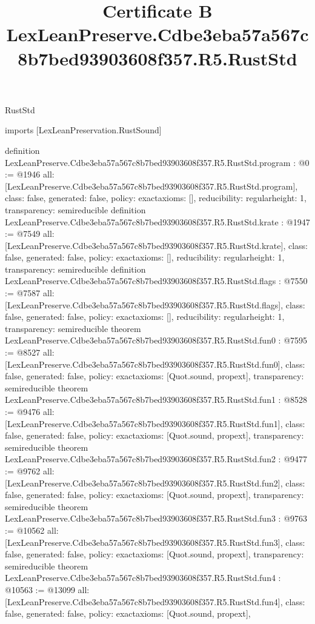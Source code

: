 \begin{lexlean}{RustStd}
\title{Certificate B LexLeanPreserve.Cdbe3eba57a567c8b7bed93903608f357.R5.RustStd}
\begin{coremodule}
imports [LexLeanPreservation.RustSound]

definition LexLeanPreserve.Cdbe3eba57a567c8b7bed93903608f357.R5.RustStd.program : @0 := @1946 {
  all: [LexLeanPreserve.Cdbe3eba57a567c8b7bed93903608f357.R5.RustStd.program],
  class: false,
  generated: false,
  policy: exact{axioms: []},
  reducibility: regular{height: 1},
  transparency: semireducible
}
definition LexLeanPreserve.Cdbe3eba57a567c8b7bed93903608f357.R5.RustStd.krate : @1947 := @7549 {
  all: [LexLeanPreserve.Cdbe3eba57a567c8b7bed93903608f357.R5.RustStd.krate],
  class: false,
  generated: false,
  policy: exact{axioms: []},
  reducibility: regular{height: 1},
  transparency: semireducible
}
definition LexLeanPreserve.Cdbe3eba57a567c8b7bed93903608f357.R5.RustStd.flags : @7550 := @7587 {
  all: [LexLeanPreserve.Cdbe3eba57a567c8b7bed93903608f357.R5.RustStd.flags],
  class: false,
  generated: false,
  policy: exact{axioms: []},
  reducibility: regular{height: 1},
  transparency: semireducible
}
theorem LexLeanPreserve.Cdbe3eba57a567c8b7bed93903608f357.R5.RustStd.fun0 : @7595 := @8527 {
  all: [LexLeanPreserve.Cdbe3eba57a567c8b7bed93903608f357.R5.RustStd.fun0],
  class: false,
  generated: false,
  policy: exact{axioms: [Quot.sound, propext]},
  transparency: semireducible
}
theorem LexLeanPreserve.Cdbe3eba57a567c8b7bed93903608f357.R5.RustStd.fun1 : @8528 := @9476 {
  all: [LexLeanPreserve.Cdbe3eba57a567c8b7bed93903608f357.R5.RustStd.fun1],
  class: false,
  generated: false,
  policy: exact{axioms: [Quot.sound, propext]},
  transparency: semireducible
}
theorem LexLeanPreserve.Cdbe3eba57a567c8b7bed93903608f357.R5.RustStd.fun2 : @9477 := @9762 {
  all: [LexLeanPreserve.Cdbe3eba57a567c8b7bed93903608f357.R5.RustStd.fun2],
  class: false,
  generated: false,
  policy: exact{axioms: [Quot.sound, propext]},
  transparency: semireducible
}
theorem LexLeanPreserve.Cdbe3eba57a567c8b7bed93903608f357.R5.RustStd.fun3 : @9763 := @10562 {
  all: [LexLeanPreserve.Cdbe3eba57a567c8b7bed93903608f357.R5.RustStd.fun3],
  class: false,
  generated: false,
  policy: exact{axioms: [Quot.sound, propext]},
  transparency: semireducible
}
theorem LexLeanPreserve.Cdbe3eba57a567c8b7bed93903608f357.R5.RustStd.fun4 : @10563 := @13099 {
  all: [LexLeanPreserve.Cdbe3eba57a567c8b7bed93903608f357.R5.RustStd.fun4],
  class: false,
  generated: false,
  policy: exact{axioms: [Quot.sound, propext]},
}
\end{coremodule}
\end{lexlean}
